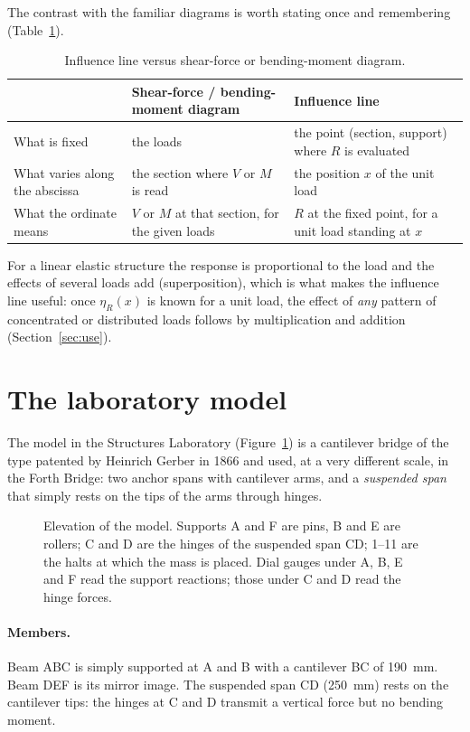 \documentclass[11pt,a4paper]{article}
\newcommand{\il}[1]{\eta_{#1}}
\begin{document}
The contrast with the familiar diagrams is worth stating once and remembering (Table~\ref{tab:contrast}).

\begin{table}[h]
\centering\small
\caption{Influence line versus shear-force or bending-moment diagram.}
\label{tab:contrast}
\begin{tabular}{@{}p{3.6cm}p{5.3cm}p{5.3cm}@{}}
\toprule
 & Shear-force / bending-moment diagram & Influence line\\
\midrule
What is fixed & the loads & the point (section, support) where $R$ is evaluated\\
What varies along the abscissa & the section where $V$ or $M$ is read & the position $x$ of the unit load\\
What the ordinate means & $V$ or $M$ at that section, for the given loads & $R$ at the fixed point, for a unit load standing at $x$\\
\bottomrule
\end{tabular}
\end{table}

For a linear elastic structure the response is proportional to the load and the effects of several loads add (superposition), which is what makes the influence line useful: once $\il{R}(x)$ is known for a unit load, the effect of \emph{any} pattern of concentrated or distributed loads follows by multiplication and addition (Section~\ref{sec:use}).

\section{The laboratory model}
\label{sec:model}
The model in the Structures Laboratory (Figure~\ref{fig:model}) is a cantilever bridge of the type patented by Heinrich Gerber in 1866 and used, at a very different scale, in the Forth Bridge: two anchor spans with cantilever arms, and a \emph{suspended span} that simply rests on the tips of the arms through hinges.

\begin{figure}[h]
\centering
\ILbridge
\caption{Elevation of the model. Supports A and F are pins, B and E are rollers; C and D are the hinges of the suspended span CD; 1--11 are the halts at which the mass is placed. Dial gauges under A, B, E and F read the support reactions; those under C and D read the hinge forces.}
\label{fig:model}
\end{figure}

\paragraph{Members.} Beam ABC is simply supported at A and B with a cantilever BC of \SI{190}{mm}. Beam DEF is its mirror image. The suspended span CD (\SI{250}{mm}) rests on the cantilever tips: the hinges at C and D transmit a vertical force but no bending moment.
\end{document}

